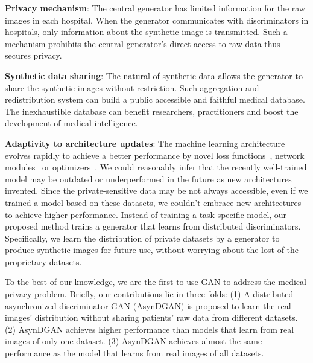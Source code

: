 \textbf{Privacy mechanism}:
The central generator has limited information for the raw images in each hospital. When the generator communicates with discriminators in hospitals, only information about the synthetic image is transmitted. Such a mechanism prohibits the central generator's direct access to raw data thus secures privacy.

\textbf{Synthetic data sharing}: The natural of synthetic data allows the generator to share the synthetic images without restriction. Such aggregation and redistribution system can build a public accessible and faithful medical database. The inexhaustible database can benefit researchers, practitioners and boost the development of medical intelligence.
  
\textbf{Adaptivity to architecture updates}: The machine learning architecture evolves rapidly to achieve a better performance by novel loss functions~\cite{sudre2017generalised,hochberg1964depth}, network modules~\cite{hoffman2016fcn, ronneberger2015u,milletari2016v,qu2019improving} or optimizers~\cite{ruder2016overview, zeiler2012adadelta, mason2000boosting,zhang2019taming,zhanglocal}. 
We could reasonably infer that the recently well-trained model may be outdated or underperformed in the future as new architectures invented. Since the private-sensitive data may be not always accessible, even if we trained a model based on these datasets, we couldn't embrace new architectures to achieve higher performance. Instead of training a task-specific model, our proposed method trains a generator that learns from distributed discriminators. Specifically, we learn the distribution of private datasets by a generator to produce synthetic images for future use, without worrying about the lost of the proprietary datasets.

To the best of our knowledge, we are the first to use GAN to address the medical privacy problem. Briefly, our contributions lie in three folds: (1) A distributed asynchronized discriminator GAN (AsynDGAN) is proposed to learn the real images' distribution without sharing patients' raw data from different datasets. (2) AsynDGAN achieves higher performance than models that learn from real images of only one dataset. (3) AsynDGAN achieves almost the same performance as the model that learns from real images of all datasets.



